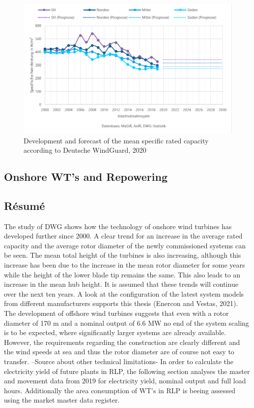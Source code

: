 \documentclass[a4paper,11pt]{article}
\begin{document}
\begin{figure}[H]

{\centering \includegraphics[width=1\linewidth]{figures/DWG/DWG_Spezifische_Nennleistung} 

}

\caption{Development and forecast of the mean specific rated capacity according to Deutsche WindGuard, 2020}\label{fig:spec}
\end{figure}
\hypertarget{onshore-wts-and-repowering}{%
\subsection{Onshore WT's and Repowering}\label{onshore-wts-and-repowering}}

\hypertarget{ruxe9sumuxe9}{%
\subsection{Résumé}\label{ruxe9sumuxe9}}

The study of DWG shows how the technology of onshore wind turbines has developed further since 2000. A clear trend for an increase in the average rated capacity and the average rotor diameter of the newly commissioned systems can be seen. The mean total height of the turbines is also increasing, although this increase has been due to the increase in the mean rotor diameter for some years while the height of the lower blade tip remains the same. This also leads to an increase in the mean hub height. It is assumed that these trends will continue over the next ten years. A look at the configuration of the latest system models from different manufacturers supports this thesis (Enercon and Vestas, 2021). The development of offshore wind turbines suggests that even with a rotor diameter of 170 m and a nominal output of 6.6 MW no end of the system scaling is to be expected, where significantly larger systems are already available. However, the requirements regarding the construction are clearly different and the wind speeds at sea and thus the rotor diameter are of course not easy to transfer. --Source about other technical limitations-
In order to calculate the electricity yield of future plants in RLP, the following section analyses the master and movement data from 2019 for electricity yield, nominal output and full load hours. Additionally the area consumption of WT's in RLP is beeing assessed using the market master data register.
\end{document}
